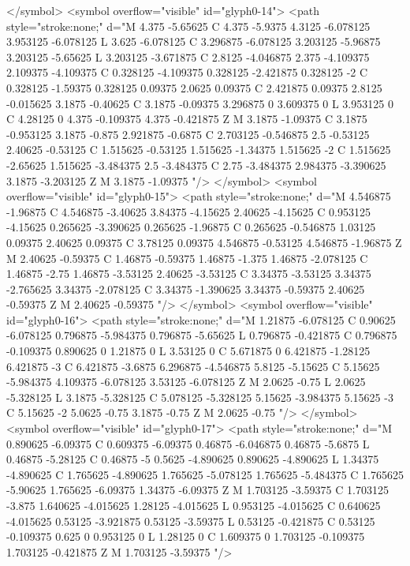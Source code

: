 </symbol>
<symbol overflow="visible" id="glyph0-14">
<path style="stroke:none;" d="M 4.375 -5.65625 C 4.375 -5.9375 4.3125 -6.078125 3.953125 -6.078125 L 3.625 -6.078125 C 3.296875 -6.078125 3.203125 -5.96875 3.203125 -5.65625 L 3.203125 -3.671875 C 2.8125 -4.046875 2.375 -4.109375 2.109375 -4.109375 C 0.328125 -4.109375 0.328125 -2.421875 0.328125 -2 C 0.328125 -1.59375 0.328125 0.09375 2.0625 0.09375 C 2.421875 0.09375 2.8125 -0.015625 3.1875 -0.40625 C 3.1875 -0.09375 3.296875 0 3.609375 0 L 3.953125 0 C 4.28125 0 4.375 -0.109375 4.375 -0.421875 Z M 3.1875 -1.09375 C 3.1875 -0.953125 3.1875 -0.875 2.921875 -0.6875 C 2.703125 -0.546875 2.5 -0.53125 2.40625 -0.53125 C 1.515625 -0.53125 1.515625 -1.34375 1.515625 -2 C 1.515625 -2.65625 1.515625 -3.484375 2.5 -3.484375 C 2.75 -3.484375 2.984375 -3.390625 3.1875 -3.203125 Z M 3.1875 -1.09375 "/>
</symbol>
<symbol overflow="visible" id="glyph0-15">
<path style="stroke:none;" d="M 4.546875 -1.96875 C 4.546875 -3.40625 3.84375 -4.15625 2.40625 -4.15625 C 0.953125 -4.15625 0.265625 -3.390625 0.265625 -1.96875 C 0.265625 -0.546875 1.03125 0.09375 2.40625 0.09375 C 3.78125 0.09375 4.546875 -0.53125 4.546875 -1.96875 Z M 2.40625 -0.59375 C 1.46875 -0.59375 1.46875 -1.375 1.46875 -2.078125 C 1.46875 -2.75 1.46875 -3.53125 2.40625 -3.53125 C 3.34375 -3.53125 3.34375 -2.765625 3.34375 -2.078125 C 3.34375 -1.390625 3.34375 -0.59375 2.40625 -0.59375 Z M 2.40625 -0.59375 "/>
</symbol>
<symbol overflow="visible" id="glyph0-16">
<path style="stroke:none;" d="M 1.21875 -6.078125 C 0.90625 -6.078125 0.796875 -5.984375 0.796875 -5.65625 L 0.796875 -0.421875 C 0.796875 -0.109375 0.890625 0 1.21875 0 L 3.53125 0 C 5.671875 0 6.421875 -1.28125 6.421875 -3 C 6.421875 -3.6875 6.296875 -4.546875 5.8125 -5.15625 C 5.15625 -5.984375 4.109375 -6.078125 3.53125 -6.078125 Z M 2.0625 -0.75 L 2.0625 -5.328125 L 3.1875 -5.328125 C 5.078125 -5.328125 5.15625 -3.984375 5.15625 -3 C 5.15625 -2 5.0625 -0.75 3.1875 -0.75 Z M 2.0625 -0.75 "/>
</symbol>
<symbol overflow="visible" id="glyph0-17">
<path style="stroke:none;" d="M 0.890625 -6.09375 C 0.609375 -6.09375 0.46875 -6.046875 0.46875 -5.6875 L 0.46875 -5.28125 C 0.46875 -5 0.5625 -4.890625 0.890625 -4.890625 L 1.34375 -4.890625 C 1.765625 -4.890625 1.765625 -5.078125 1.765625 -5.484375 C 1.765625 -5.90625 1.765625 -6.09375 1.34375 -6.09375 Z M 1.703125 -3.59375 C 1.703125 -3.875 1.640625 -4.015625 1.28125 -4.015625 L 0.953125 -4.015625 C 0.640625 -4.015625 0.53125 -3.921875 0.53125 -3.59375 L 0.53125 -0.421875 C 0.53125 -0.109375 0.625 0 0.953125 0 L 1.28125 0 C 1.609375 0 1.703125 -0.109375 1.703125 -0.421875 Z M 1.703125 -3.59375 "/>
